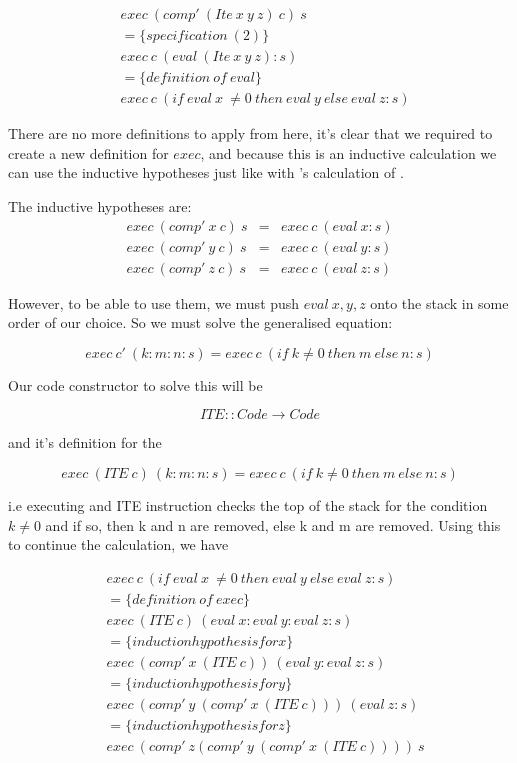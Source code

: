 \documentclass {article}
\begin{document}
\begin{align*}
	&exec \ (comp' \ (Ite \ x \ y \ z) \ c) \ s \\
	&= \{specification \ (2) \} \\
	&exec \ c \ (eval \ (Ite \ x \ y \ z) : s) \\
	&= \{definition \ of \ eval\} \\
	&exec \ c \ (if \ eval \ x \ \not= 0 \ then \ eval \ y \ else \ eval \ z :s)
\end{align*}

There are no more definitions to apply from here,
it's clear that we required to
create a new definition for $exec$,
and because this is an inductive calculation
we can use the inductive hypotheses
just like with \BH's calculation of \add.

The inductive hypotheses are:
\begin{eqnarray*}
	exec \ (comp' \ x \ c) \ s &=& exec \ c \ (eval \ x:s) \\
	exec \ (comp' \ y \ c) \ s &=& exec \ c \ (eval \ y:s) \\
	exec \ (comp' \ z \ c) \ s &=& exec \ c \ (eval \ z:s)
\end{eqnarray*}

However, to be able to use them,
we must push $eval \ x,y,z$ onto the stack
in some order of our choice.
So we must solve the generalised equation:

	\[ exec \ c' \ (k:m:n:s) = exec \ c \ (if \ k \not= 0 \ then \ m \ else \ n:s)\]

Our code constructor to solve this will be

\[ ITE :: Code \rightarrow Code \]

and it's definition for the \vm

\[ exec \ (ITE \ c) \ (k:m:n:s) = exec \ c \ (if \ k \not= 0 \ then \ m \ else \ n:s) \]

i.e executing and ITE instruction
checks the top of the stack for the condition $k \not= 0$
and if so, then k and n are removed,
else k and m are removed.
Using this to continue the calculation, we have

\begin{align*}
	&exec \ c \ (if \ eval \ x \ \not= 0 \ then \ eval \ y \ else \ eval \ z :s) \\
	&= \{definition \ of \ exec\} \\
	&exec \ (ITE \ c) \ (eval \ x:eval \ y:eval \ z:s) \\
	&= \{induction hypothesis for x\} \\
	&exec \ (comp' \ x \ (ITE \ c)) \ (eval \ y:eval \ z:s) \\
	&= \{induction hypothesis for y\} \\
	&exec \ (comp' \ y \ (comp' \ x \ (ITE \ c))) \ (eval \ z:s) \\
	&= \{induction hypothesis for z\} \\
	&exec \ (comp' \ z (comp' \ y \ (comp' \ x \ (ITE \ c)))) \ s
\end{align*}
\end{document}
